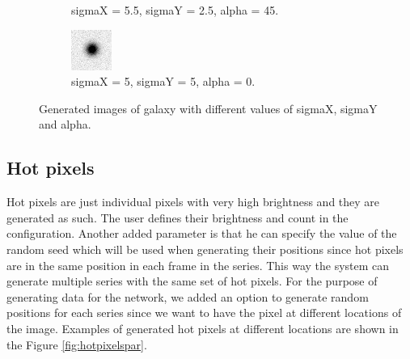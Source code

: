 \begin{figure}[!h]
\begin{subfigure}[t]{.23\textwidth}
        \caption{sigmaX = 5.5, sigmaY = 2.5, alpha = 45.}
        \label{fig:galaxyC}
    \end{subfigure}
    \begin{subfigure}[t]{.23\textwidth}
        \centering
        \includegraphics[width=\textwidth]{images/galaxyD.png}
        \caption{sigmaX = 5, sigmaY = 5, alpha = 0.}
        \label{fig:galaxyD}
    \end{subfigure}

    \caption{Generated images of galaxy with different values of sigmaX, sigmaY and alpha.}
    \label{fig:galaxypar}
\end{figure}

\subsection{Hot pixels}
Hot pixels are just individual pixels with very high brightness and they are generated as such. The user defines their brightness and count in the configuration. Another added parameter is that he can specify the value of the random seed which will be used when generating their positions since hot pixels are in the same position in each frame in the series. This way the system can generate multiple series with the same set of hot pixels. For the purpose of generating data for the network, we added an option to generate random positions for each series since we want to have the pixel at different locations of the image. Examples of generated hot pixels at different locations are shown in the Figure \ref{fig:hotpixelspar}.

